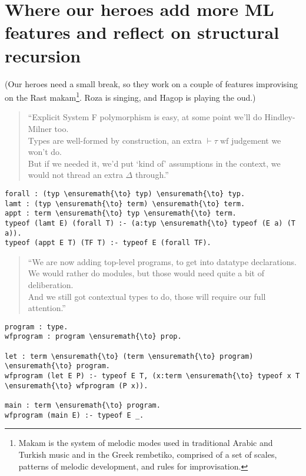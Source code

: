 \section{Where our heroes add more ML features and reflect on structural
recursion}\label{where-our-heroes-add-more-ml-features-and-reflect-on-structural-recursion}

\begin{scenecomment}
(Our heroes need a small break, so they work on a couple of features improvising on the Rast makam\footnote{Makam is the system of melodic modes used in traditional Arabic and Turkish music and in the Greek rembetiko, comprised of a set of scales, patterns of melodic development, and rules for improvisation.}. Roza is singing, and Hagop is playing the oud.)
\end{scenecomment}

\begin{verse}
``Explicit System F polymorphism is easy, at some point we'll do Hindley-Milner too. \\
Types are well-formed by construction, an extra $\vdash \tau \; \text{wf}$ judgement we won't do. \\
But if we needed it, we'd put `kind of' assumptions in the context, we would not thread an extra $\Delta$ through.''
\end{verse}

\begin{verbatim}
forall : (typ \ensuremath{\to} typ) \ensuremath{\to} typ.
lamt : (typ \ensuremath{\to} term) \ensuremath{\to} term.
appt : term \ensuremath{\to} typ \ensuremath{\to} term.
typeof (lamt E) (forall T) :- (a:typ \ensuremath{\to} typeof (E a) (T a)).
typeof (appt E T) (TF T) :- typeof E (forall TF).
\end{verbatim}

\begin{verse}
``We are now adding top-level programs, to get into datatype declarations. \\
We would rather do modules, but those would need quite a bit of deliberation. \\
And we still got contextual types to do, those will require our full attention.''
\end{verse}

\begin{verbatim}
program : type.
wfprogram : program \ensuremath{\to} prop.

let : term \ensuremath{\to} (term \ensuremath{\to} program) \ensuremath{\to} program.
wfprogram (let E P) :- typeof E T, (x:term \ensuremath{\to} typeof x T \ensuremath{\to} wfprogram (P x)).

main : term \ensuremath{\to} program.
wfprogram (main E) :- typeof E _.
\end{verbatim}

